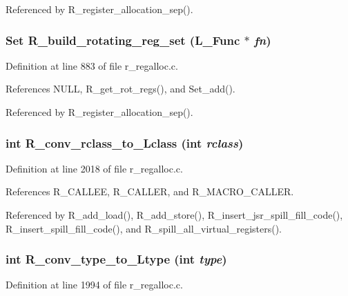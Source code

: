 Referenced by R\_\-register\_\-allocation\_\-sep().
\subsubsection{\setlength{\rightskip}{0pt plus 5cm}\bf{Set} R\_\-build\_\-rotating\_\-reg\_\-set (L\_\-Func $\ast$ {\em fn})}\label{r__regalloc_8c_03a8d8fa64ee44840f1b22cf3b942ccb}




Definition at line 883 of file r\_\-regalloc.c.

References NULL, R\_\-get\_\-rot\_\-regs(), and Set\_\-add().

Referenced by R\_\-register\_\-allocation\_\-sep().
\subsubsection{\setlength{\rightskip}{0pt plus 5cm}int R\_\-conv\_\-rclass\_\-to\_\-Lclass (int {\em rclass})}\label{r__regalloc_8c_529e8e448425ecb38299d72b59ba5522}




Definition at line 2018 of file r\_\-regalloc.c.

References R\_\-CALLEE, R\_\-CALLER, and R\_\-MACRO\_\-CALLER.

Referenced by R\_\-add\_\-load(), R\_\-add\_\-store(), R\_\-insert\_\-jsr\_\-spill\_\-fill\_\-code(), R\_\-insert\_\-spill\_\-fill\_\-code(), and R\_\-spill\_\-all\_\-virtual\_\-registers().
\subsubsection{\setlength{\rightskip}{0pt plus 5cm}int R\_\-conv\_\-type\_\-to\_\-Ltype (int {\em type})}\label{r__regalloc_8c_145831cd48f7466e95577c28c9cee904}




Definition at line 1994 of file r\_\-regalloc.c.

